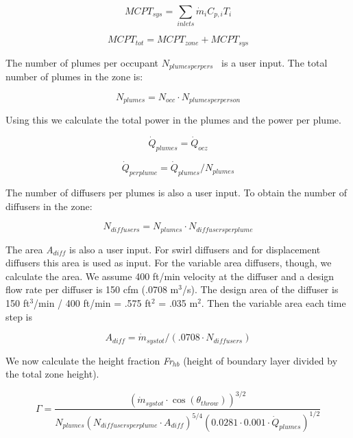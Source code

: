 \begin{equation}
MCP{T_{sys}} = \sum\limits_{inlets} {{{\dot m}_i}} {C_{p,i}}{T_i}
\end{equation}

\begin{equation}
MCP{T_{tot}} = MCP{T_{zone}} + MCP{T_{sys}}
\end{equation}

The number of plumes per occupant \({N_{plumesperpers}}\) ~is a user input. The total number of plumes in the zone is:

\begin{equation}
{N_{plumes}} = {N_{occ}} \cdot {N_{plumesperperson}}
\end{equation}

Using this we calculate the total power in the plumes and the power per plume.

\begin{equation}
{\dot Q_{plumes}} = {\dot Q_{ocz}}
\end{equation}

\begin{equation}
{\dot Q_{perplume}} = {\dot Q_{plumes}}/{N_{plumes}}
\end{equation}

The number of diffusers per plumes is also a user input. To obtain the number of diffusers in the zone:

\begin{equation}
{N_{diffusers}} = {N_{plumes}}\cdot {N_{diffusersperplume}}
\end{equation}

The area \emph{A\(_{diff}\)} is also a user input. For swirl diffusers and for displacement diffusers this area is used as input. For the variable area diffusers, though, we calculate the area. We assume 400 ft/min velocity at the diffuser and a design flow rate per diffuser is 150 cfm (.0708 m\(^{3}\)/s). The design area of the diffuser is 150 ft\(^{3}\)/min / 400 ft/min = .575 ft\(^{2}\) = .035 m\(^{2}\). Then the variable area each time step is

\begin{equation}
{A_{diff}} = {\dot m_{systot}}/(.0708\cdot {N_{diffusers}})
\end{equation}

We now calculate the height fraction \emph{Fr\(_{hb}\)} (height of boundary layer divided by the total zone height).

\begin{equation}
\Gamma  = \frac{{{{({{\dot m}_{systot}}\cdot \cos ({\theta_{throw}}))}^{3/2}}}}{{{N_{plumes}}{{({N_{diffusersperplume}}\cdot {A_{diff}})}^{5/4}}{{(0.0281\cdot 0.001\cdot {{\dot Q}_{plumes}})}^{1/2}}}}
\end{equation}

